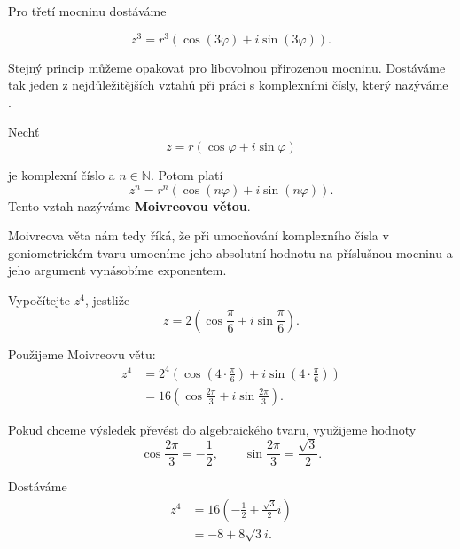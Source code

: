 \documentclass[12pt,a4paper]{article}
\begin{document}
Pro třetí mocninu dostáváme

\[
    z^3 = r^3   \left(
                    \cos(3\varphi) + i\sin(3\varphi)
                \right).
\]

Stejný princip můžeme opakovat pro libovolnou přirozenou mocninu. 
Dostáváme tak jeden z nejdůležitějších vztahů při práci s komplexními čísly, 
který nazýváme .


\begin{definitionbox}
    Nechť
    \[
        z = r \left(\cos\varphi + i\sin\varphi\right)
    \]

    je komplexní číslo a $n\in\mathbb{N}$. Potom platí
    \[
        z^n = r^n \left(\cos(n\varphi) + i\sin(n\varphi)\right).
    \]
    Tento vztah nazýváme \textbf{Moivreovou větou}.
\end{definitionbox}

Moivreova věta nám tedy říká, že při umocňování komplexního čísla 
v goniometrickém tvaru umocníme jeho absolutní hodnotu na příslušnou mocninu 
a jeho argument vynásobíme exponentem.

\begin{examplebox}
    Vypočítejte $z^4$, jestliže
    \[
        z = 2 \left(\cos\frac{\pi}{6} + i\sin\frac{\pi}{6}\right).
    \]

    Použijeme Moivreovu větu:
    \begin{align*}
        z^4 &= 2^4 \left(
                        \cos\left(4\cdot\frac{\pi}{6}\right)
                        +
                        i\sin\left(4\cdot\frac{\pi}{6}\right)
                    \right)\\
            &= 16   \left(
                        \cos\frac{2\pi}{3} + i\sin\frac{2\pi}{3}
                    \right).
    \end{align*}

    Pokud chceme výsledek převést do algebraického tvaru, využijeme hodnoty
    \[
        \cos\frac{2\pi}{3} = -\frac{1}{2},
            \qquad
        \sin\frac{2\pi}{3} = \frac{\sqrt{3}}{2}.
    \]

    Dostáváme
    \begin{align*}
        z^4 &= 16   \left(
                        -\frac{1}{2} + \frac{\sqrt{3}}{2}i
                    \right)\\
            &= -8+8 \sqrt{3}i.
    \end{align*}
\end{examplebox}
\end{document}
